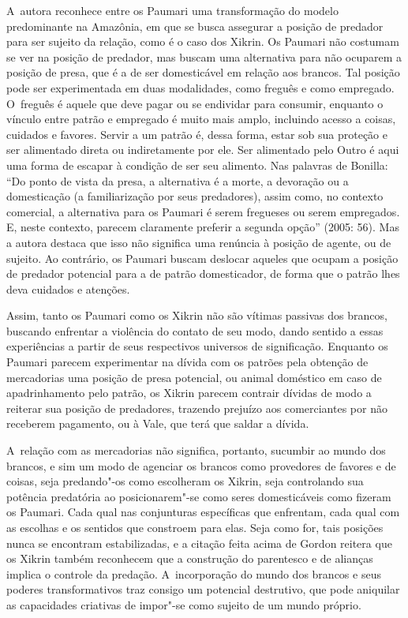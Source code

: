 A~autora reconhece entre os Paumari uma transformação do modelo
predominante na Amazônia, em que se busca assegurar a posição de
predador para ser sujeito da relação, como é o caso dos Xikrin. Os
Paumari não costumam se ver na posição de predador, mas buscam uma
alternativa para não ocuparem a posição de presa, que é a de ser
domesticável em relação aos brancos. Tal posição pode ser experimentada
em duas modalidades, como freguês e como empregado. O~freguês é aquele
que deve pagar ou se endividar para consumir, enquanto o vínculo entre
patrão e empregado é muito mais amplo, incluindo acesso a coisas,
cuidados e favores. Servir a um patrão é, dessa forma, estar sob sua proteção e
ser alimentado direta ou indiretamente por ele. Ser alimentado pelo
Outro é aqui uma forma de escapar à condição de ser seu alimento. Nas
palavras de Bonilla: ``Do ponto de vista da presa, a alternativa é a
morte, a devoração ou a domesticação (a familiarização por seus
predadores), assim como, no contexto comercial, a alternativa para os
Paumari é serem fregueses ou serem empregados. E, neste contexto,
parecem claramente preferir a segunda opção'' (2005: 56). Mas a autora
destaca que isso não significa uma renúncia à posição de agente, ou de
sujeito. Ao contrário, os Paumari buscam deslocar aqueles que ocupam a
posição de predador potencial para a de patrão domesticador, de forma
que o patrão lhes deva cuidados e atenções. 

Assim, tanto os Paumari como os Xikrin não são vítimas passivas dos
brancos, buscando enfrentar a violência do contato de seu modo, dando
sentido a essas experiências a partir de seus respectivos universos de
significação. Enquanto os Paumari parecem experimentar na dívida com os
patrões pela obtenção de mercadorias uma posição de presa potencial, ou
animal doméstico em caso de apadrinhamento pelo patrão, os Xikrin
parecem contrair dívidas de modo a reiterar sua posição de predadores,
trazendo prejuízo aos comerciantes por não receberem pagamento, ou à
Vale, que terá que saldar a dívida.

A~relação com as mercadorias não significa, portanto, sucumbir ao mundo
dos brancos, e sim um modo de agenciar os brancos como provedores de
favores e de coisas, seja predando"-os como escolheram os Xikrin, seja
controlando sua potência predatória ao posicionarem"-se como seres
domesticáveis como fizeram os Paumari. Cada qual nas conjunturas
específicas que enfrentam, cada qual com as escolhas e os sentidos que
constroem para elas. Seja como for, tais posições nunca se encontram
estabilizadas, e a citação feita acima de Gordon reitera que os Xikrin
também reconhecem que a construção do parentesco e de alianças implica
o controle da predação. A~incorporação do mundo dos brancos e seus
poderes transformativos traz consigo um potencial destrutivo, que pode
aniquilar as capacidades criativas de impor"-se como sujeito de um mundo
próprio.

